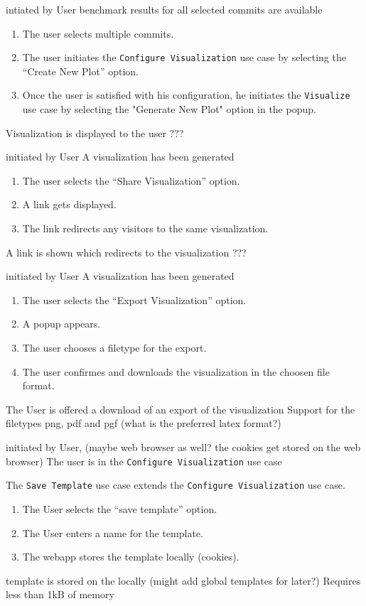 \bigskip

{intiated by User}
{benchmark results for all selected commits are available}
{\begin{enumerate}
    \item The user selects multiple commits.
    \item The user initiates the \texttt{Configure Visualization} use case by selecting the \enquote{Create New Plot} option.
    \item Once the user is satisfied with his \gls{configuration}, he initiates the \texttt{Visualize} use case by selecting the "Generate New Plot" option in the popup.
\end{enumerate}}
{Visualization is displayed to the user}
{???}

\bigskip

{initiated by User}
{A \gls{visualization} has been generated}
{\begin{enumerate}
    \item The user selects the \enquote{Share Visualization} option.
    \item A link gets displayed.
    \item The link redirects any visitors to the same \gls{visualization}.
\end{enumerate}} 
{A link is shown which redirects to the \gls{visualization}}
{???}

\bigskip

{initiated by User}
{A \gls{visualization} has been generated}
{\begin{enumerate}
    \item The user selects the \enquote{Export Visualization} option.
    \item A popup appears.
    \item The user chooses a filetype for the export.
    \item The user confirmes and downloads the \gls{visualization} in the choosen file format.
\end{enumerate}} 
{The User is offered a download of an export of the \gls{visualization}}
{Support for the filetypes png, pdf and pgf (what is the preferred latex format?)}

\bigskip

{initiated by User, (maybe web browser as well? the cookies get stored on the web browser)}
{The user is in the \texttt{Configure Visualization} use case}
{The \texttt{Save Template} use case extends the \texttt{Configure Visualization} use case.
\begin{enumerate}
    \item The User selects the \enquote{save template} option.
    \item The User enters a name for the \gls{template}.
    \item The webapp stores the template locally (cookies).
\end{enumerate}} 
{\Gls{template} is stored on the locally (might add global templates for later?)}
{Requires less than 1kB of memory}

